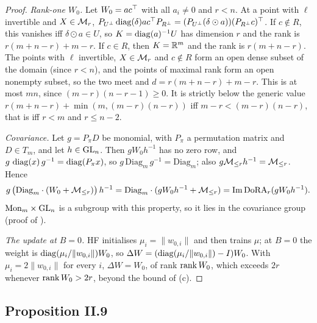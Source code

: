\begin{proof}
\emph{Rank-one $W_0$.} Let $W_0=ac^{\top}$ with all $a_i\ne0$ and $r<n$. At a point with $\ell$ invertible and $X\in\mathcal{M}_r$,
$P_{U^\perp}\operatorname{diag}(\delta)ac^{\top} P_{R^\perp}=(P_{U^\perp}(\delta\odot a))(P_{R^\perp}c)^{\top}$. If $c\notin R$, this vanishes iff
$\delta\odot a\in U$, so $K=\operatorname{diag}(a)^{-1}U$ has dimension $r$ and the rank is $r(m+n-r)+m-r$. If $c\in R$, then $K=\mathbb{R}^m$ and
the rank is $r(m+n-r)$. The points with $\ell$ invertible, $X\in\mathcal{M}_r$ and $c\notin R$ form an open dense subset of the
domain (since $r<n$), and the points of maximal rank form an open nonempty subset, so the two meet and
$d=r(m+n-r)+m-r$. This is at most $mn$, since $(m-r)(n-r-1)\ge0$. It is strictly below the generic value
$r(m+n-r)+\min(m,(m-r)(n-r))$ iff $m-r<(m-r)(n-r)$, that is iff $r<m$ and $r\le n-2$.

\emph{Covariance.} Let $g=P_\pi D$ be monomial, with $P_\pi$ a permutation matrix and $D\in T_m$, and let $h\in\mathrm{GL}_n$.
Then $gW_0h^{-1}$ has no zero row, and $g\,\operatorname{diag}(x)\,g^{-1}=\operatorname{diag}(P_\pi x)$, so $g\,\mathrm{Diag}_m\,g^{-1}=\mathrm{Diag}_m$;
also $g\mathcal{M}_{\le r} h^{-1}=\mathcal{M}_{\le r}$. Hence
\begin{equation*}
  g\,\big(\mathrm{Diag}_m\cdot(W_0+\mathcal{M}_{\le r})\big)\,h^{-1}=\mathrm{Diag}_m\cdot(gW_0h^{-1}+\mathcal{M}_{\le r})=\operatorname{Im}\mathrm{DoRA}_r(gW_0h^{-1}).
\end{equation*}
$\mathrm{Mon}_m\times\mathrm{GL}_n$ is a subgroup with this property, so it lies in the covariance group (proof of
).

\emph{The update at $B=0$.} HF initialises $\mu_i=\lVert w_{0,i}\rVert$ and then trains $\mu$; at $B=0$ the weight is
$\operatorname{diag}(\mu_i/\lVert w_{0,i}\rVert)W_0$, so $\Delta W=(\operatorname{diag}(\mu_i/\lVert w_{0,i}\rVert)-I)W_0$. With
$\mu_i=2\lVert w_{0,i}\rVert$ for every $i$, $\Delta W=W_0$, of rank $\operatorname{rank} W_0$, which exceeds $2r$ whenever $\operatorname{rank} W_0>2r$,
beyond the bound of (c).
\end{proof}

\subsection{Proposition II.9}\label{proof:II.9}

